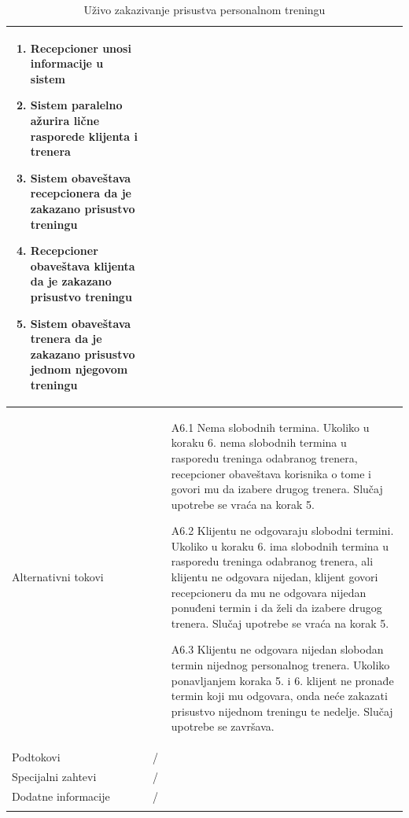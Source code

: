 \begin{longtable}{| p{} | p{} |}
\begin{enumerate}
    \item Recepcioner unosi informacije u sistem
    \item Sistem paralelno ažurira lične rasporede klijenta i trenera
    \item Sistem obaveštava recepcionera da je zakazano prisustvo treningu
    \item Recepcioner obaveštava klijenta da je zakazano prisustvo treningu
    \item Sistem obaveštava trenera da je zakazano prisustvo jednom njegovom treningu
   \end{enumerate}\\
\hline
    Alternativni tokovi & 
    \begin{itemize}
    \item[A6.1] Nema slobodnih termina. Ukoliko u koraku 6. nema slobodnih termina u rasporedu treninga odabranog trenera, recepcioner obaveštava korisnika o tome i govori mu da izabere drugog trenera. Slučaj upotrebe se vraća na korak 5.
    \item[A6.2] Klijentu ne odgovaraju slobodni termini. Ukoliko u koraku 6. ima slobodnih termina u rasporedu treninga odabranog trenera, ali klijentu ne odgovara nijedan, klijent govori recepcioneru da mu ne odgovara nijedan ponuđeni termin i da želi da izabere drugog trenera. Slučaj upotrebe se vraća na korak 5.
    \item[A6.3] Klijentu ne odgovara nijedan slobodan termin nijednog personalnog trenera. Ukoliko ponavljanjem koraka 5. i 6. klijent ne pronađe termin koji mu odgovara, onda neće zakazati prisustvo nijednom treningu te nedelje. Slučaj upotrebe se završava.
   \end{itemize}\\
\hline
    Podtokovi & /\\
\hline
    Specijalni zahtevi & /\\
\hline
    Dodatne informacije & /\\
\hline
\caption{Uživo zakazivanje prisustva personalnom treningu}
\end{longtable}

